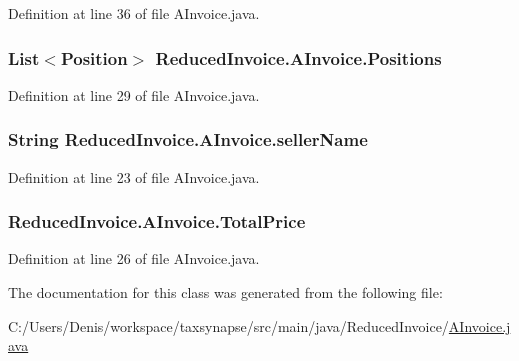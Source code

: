 Definition at line 36 of file A\+Invoice.\+java.

\subsubsection[{\texorpdfstring{Positions}{Positions}}]{\setlength{\rightskip}{0pt plus 5cm}List$<${\bf Position}$>$ Reduced\+Invoice.\+A\+Invoice.\+Positions\hspace{0.3cm}{\ttfamily [protected]}}\hypertarget{class_reduced_invoice_1_1_a_invoice_a5b51f1865386bd021580507c7133f69a}{}\label{class_reduced_invoice_1_1_a_invoice_a5b51f1865386bd021580507c7133f69a}


Definition at line 29 of file A\+Invoice.\+java.

\subsubsection[{\texorpdfstring{seller\+Name}{sellerName}}]{\setlength{\rightskip}{0pt plus 5cm}String Reduced\+Invoice.\+A\+Invoice.\+seller\+Name\hspace{0.3cm}{\ttfamily [protected]}}\hypertarget{class_reduced_invoice_1_1_a_invoice_ae00a97e1c74841fe0b0b43fccd1da24d}{}\label{class_reduced_invoice_1_1_a_invoice_ae00a97e1c74841fe0b0b43fccd1da24d}


Definition at line 23 of file A\+Invoice.\+java.

\subsubsection[{\texorpdfstring{Total\+Price}{TotalPrice}}]{ Reduced\+Invoice.\+A\+Invoice.\+Total\+Price\hspace{0.3cm}{\ttfamily [protected]}}\hypertarget{class_reduced_invoice_1_1_a_invoice_a72b831e7ee0b4501fc949f61aecdd498}{}\label{class_reduced_invoice_1_1_a_invoice_a72b831e7ee0b4501fc949f61aecdd498}


Definition at line 26 of file A\+Invoice.\+java.



The documentation for this class was generated from the following file\+:\begin{DoxyCompactItemize}
\item 
C\+:/\+Users/\+Denis/workspace/taxsynapse/src/main/java/\+Reduced\+Invoice/\hyperlink{_a_invoice_8java}{A\+Invoice.\+java}\end{DoxyCompactItemize}
